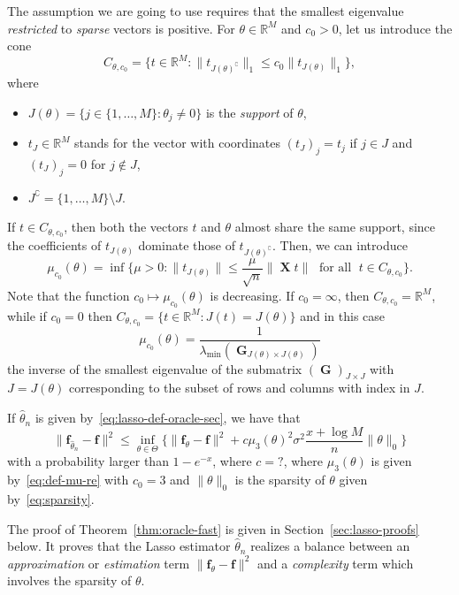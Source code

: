 \documentclass[
	fontsize=11pt, %
	twoside=false, %
	numbers=noenddot, %
]{kaobook}
\DeclareMathOperator{\bG}{{\boldsymbol G}}
\DeclareMathOperator{\bX}{{\boldsymbol X}}
\renewcommand{\bf}{{\boldsymbol f}}
\newcommand{\R}{\mathbb R}
\newcommand{\wh}{\widehat}
\newcommand{\norm}[1]{\| #1 \|}
\begin{document}
The assumption we are going to use requires that the smallest eigenvalue \emph{restricted} to \emph{sparse} vectors is positive.
For $\theta \in \R^M$ and $c_0 > 0$, let us introduce the cone
\begin{equation*}
	C_{\theta, c_0} = \big\{ t \in \R^M : \norm{t_{J(\theta)^\complement}}_1 
	\leq c_0 \norm{t_{J(\theta)}}_1 \big\},
\end{equation*}
where
\begin{itemize}
	\item $J(\theta) = \{ j \in \{1, \ldots, M\} : \theta_j \neq 0 \}$ is the 
	\emph{support} of $\theta$,
	\item $t_J \in \R^M$ stands for the vector with coordinates $(t_J)_j = t_j$ if $j \in J$ and $(t_J)_j = 0$ for $j \notin J$,
	\item $J^\complement = \{ 1, \ldots, M \} \setminus J$.
\end{itemize}
If $t \in C_{\theta, c_0}$, then both the vectors $t$ and $\theta$ almost share the same support, since the coefficients of $t_{J(\theta)}$ dominate those of $t_{J(\theta)^\complement}$.
Then, we can introduce 
\begin{equation}
	\label{eq:def-mu-re}
	\mu_{c_0}(\theta) = \inf \Big\{ \mu > 0 : 
	\norm{t_{J(\theta)}} \leq \frac{\mu}{\sqrt n} \norm{\bX t} 
	\; \text{ for all } \; t \in C_{\theta, c_0} \Big\}.
\end{equation}
Note that the function $c_0 \mapsto \mu_{c_0}(\theta)$ is decreasing.
If $c_0 = \infty$, then $C_{\theta, c_0} = \R^M$, while if $c_0 = 0$ then
$C_{\theta, c_0} = \{ t \in \R^M : J(t) = J(\theta) \}$ and in this case
\begin{equation*}
	\mu_{c_0}(\theta) = \frac{1}{\lambda_{\min}(\bG_{J(\theta) \times J(\theta)})}
\end{equation*}
the inverse of the smallest eigenvalue of the submatrix $(\bG)_{J \times J}$ with $J = J(\theta)$ corresponding to the subset of rows and columns with index in $J$.
\begin{theorem}
	\label{thm:oracle-fast}
	If $\wh \theta_n$ is given by~\eqref{eq:lasso-def-oracle-sec}, we have that
	\begin{equation*}
		\norm{\bf_{\wh \theta_n} - \bf}^2 \leq \inf_{\theta \in \Theta} 
		\bigg\{ \norm{\bf_{\theta} - \bf}^2  + c \mu_3(\theta)^2 \sigma^2 \frac{x + \log M}{n} \norm{\theta}_0 \bigg\}
	\end{equation*}
	with a probability larger than $1 - e^{-x}$, where $c = ?$, where $\mu_3(\theta)$ is given by~\eqref{eq:def-mu-re} with $c_0 = 3$ and $\norm{\theta}_0$ is the sparsity of $\theta$ given by~\eqref{eq:sparsity}.
\end{theorem}
The proof of Theorem~\ref{thm:oracle-fast} is given in Section~\ref{sec:lasso-proofs} below.
It proves that the Lasso estimator $\wh \theta_n$ realizes a balance between an \emph{approximation} or \emph{estimation} term $\norm{\bf_{\theta} - \bf}^2$ and a \emph{complexity} term which involves  the sparsity of $\theta$.
\end{document}
